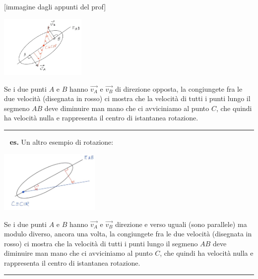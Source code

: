 [immagine dagli appunti del prof]
\begin{center}
    \includegraphics[height=3cm]{../lezione2/img9.JPG}
\end{center}
Se i due punti $A$ e $B$ hanno $\vec{v_A}$ e $\vec{v_B}$ di direzione opposta, la congiungete fra le due velocità (disegnata in rosso) ci mostra che la velocità di tutti i punti lungo il segmeno $AB$ deve diminuire man mano che ci avviciniamo al punto $C$, che quindi ha velocità nulla e rappresenta il centro di istantanea rotazione.\newline
\rule{\textwidth}{0,4pt}
\ \newline
\textbf{es.} Un altro esempio di rotazione:
\begin{center}
    \includegraphics[height=3cm]{../lezione2/img10.JPG}
\end{center} 
Se i due punti $A$ e $B$ hanno $\vec{v_A}$ e $\vec{v_B}$ direzione e verso uguali (sono parallele) ma modulo diverso, ancora una volta, la congiungete fra le due velocità (disegnata in rosso) ci mostra che la velocità di tutti i punti lungo il segmeno $AB$ deve diminuire man mano che ci avviciniamo al punto $C$, che quindi ha velocità nulla e rappresenta il centro di istantanea rotazione.\newline
\rule{\textwidth}{0,4pt}
